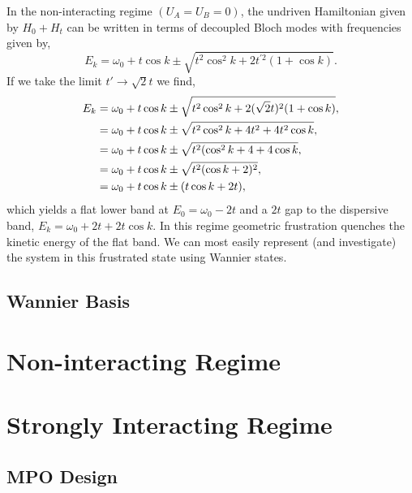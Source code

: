 In the non-interacting regime \((U_{A} = U_{B} = 0)\), the undriven Hamiltonian given by \(H_{0} + H_{t}\) can be written in terms of decoupled Bloch modes with frequencies given by,
\begin{equation}
	E_{k} = \omega_{0} + t \cos k \pm \sqrt{t^{2}\cos^{2}k + 2t^{'2}(1+\cos k)}.
	\label{eq:dim1-7}
\end{equation}
If we take the limit \(t' \rightarrow \sqrt{2}t\) we find,
\begin{align}
	E_{k} &= \omega_{0} + t \cos k \pm \sqrt{t^{2}\cos^{2}k + 2(\sqrt{2}t)^{2}(1+\cos k)}, \notag \\
	&= \omega_{0} + t \cos k \pm \sqrt{t^{2}\cos^{2}k + 4t^{2} + 4t^{2}\cos k}, \notag \\
	&= \omega_{0} + t \cos k \pm \sqrt{t^{2}(\cos^{2}k + 4 + 4\cos k}, \notag \\
	&= \omega_{0} + t \cos k \pm \sqrt{t^{2}(\cos k + 2)^{2}}, \notag \\
	&= \omega_{0} + t \cos k \pm (t\cos k + 2t),
	\label{eq:dim1-8}
\end{align}
which yields a flat lower band at \(E_{0} = \omega_{0} - 2t\) and a \(2t\) gap to the dispersive band, \(E_{k} = \omega_{0} + 2t + 2t\cos k\). In this regime geometric frustration quenches the kinetic energy of the flat band. We can most easily represent (and investigate) the system in this frustrated state using Wannier states.

\subsection{Wannier Basis} 

\section{Non-interacting Regime}

\section{Strongly Interacting Regime}

\subsection{MPO Design}